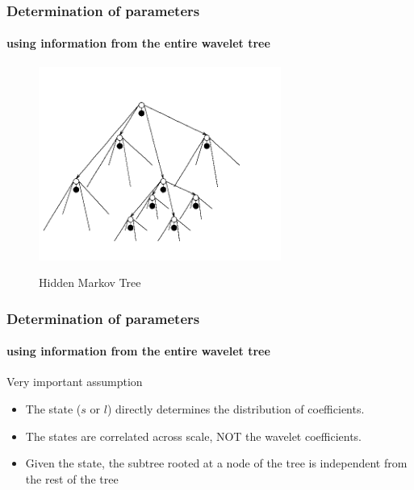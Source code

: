 \documentclass[12pt]{beamer}
\begin{document}
%   
%   

\begin{frame}
  \frametitle{Determination of parameters}
  \framesubtitle{using information from the entire wavelet tree}

  \begin{figure}[H]
  \centering
  \includegraphics[scale=0.7]{../figs/theory/hmt}
  \label{fig:hmt}
  \caption{Hidden Markov Tree}
  \end{figure} 
\end{frame}

\begin{frame}
  \frametitle{Determination of parameters}
  \framesubtitle{using information from the entire wavelet tree}
  
  \begin{alertblock}{Very important assumption}
  \begin{itemize}
    \item The state ($s$ or $l$) directly determines the distribution of coefficients.
    \item The states are correlated across scale, NOT the wavelet coefficients.
    \item Given the state, the subtree rooted at a node of the tree is independent from
    the rest of the tree
  \end{itemize}  	
  \end{alertblock}
 
\end{frame}
\end{document}
